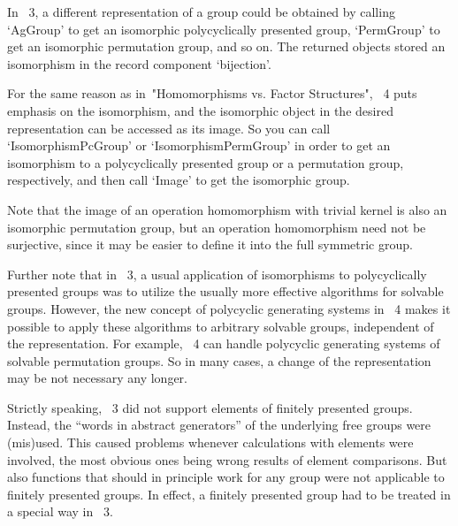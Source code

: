 
In {\GAP}~3, a different representation of a group could be obtained by
calling `AgGroup' to get an isomorphic polycyclically presented group,
`PermGroup' to get an isomorphic permutation group, and so on.
The returned objects stored an isomorphism in the record component
`bijection'.

For the same reason as in~"Homomorphisms vs. Factor Structures",
{\GAP}~4 puts emphasis on the isomorphism,
and the isomorphic object in the desired representation can be accessed
as its image.
So you can call `IsomorphismPcGroup' or `IsomorphismPermGroup' in order
to get an isomorphism to a polycyclically presented group or a
permutation group, respectively, and then call `Image' to get the
isomorphic group.

Note that the image of an operation homomorphism with trivial kernel is
also an isomorphic permutation group,
but an operation homomorphism need not be surjective,
since it may be easier to define it into the full symmetric group.

Further note that in {\GAP}~3, a usual application of isomorphisms to
polycyclically presented groups was to utilize the usually more effective
algorithms for solvable groups.
However, the new concept of polycyclic generating systems in {\GAP}~4
makes it possible to apply these algorithms to arbitrary solvable groups,
independent of the representation.
For example, {\GAP}~4 can handle polycyclic generating systems of
solvable permutation groups.
So in many cases, a change of the representation may be not necessary any
longer.




Strictly speaking, {\GAP}~3 did not support elements of finitely
presented groups.
Instead, the ``words in abstract generators'' of the underlying free
groups were (mis)used.
This caused problems whenever calculations with elements were involved,
the most obvious ones being wrong results of element comparisons.
But also functions that should in principle work for any group were not
applicable to finitely presented groups.
In effect, a finitely presented group had to be treated in a special way
in {\GAP}~3.

